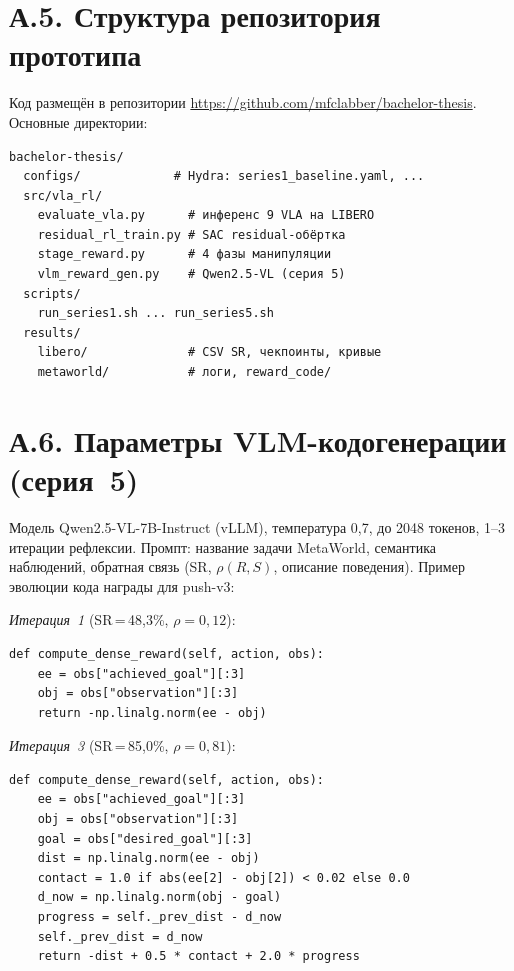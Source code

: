 \section*{А.5. Структура репозитория прототипа}

    Код размещён в репозитории \url{https://github.com/mfclabber/bachelor-thesis}. Основные директории:
{\footnotesize
\begin{verbatim}
bachelor-thesis/
  configs/             # Hydra: series1_baseline.yaml, ...
  src/vla_rl/
    evaluate_vla.py      # инференс 9 VLA на LIBERO
    residual_rl_train.py # SAC residual-обёртка
    stage_reward.py      # 4 фазы манипуляции
    vlm_reward_gen.py    # Qwen2.5-VL (серия 5)
  scripts/
    run_series1.sh ... run_series5.sh
  results/
    libero/              # CSV SR, чекпоинты, кривые
    metaworld/           # логи, reward_code/
\end{verbatim}
}

\section*{А.6. Параметры VLM-кодогенерации (серия~5)}

    Модель Qwen2.5-VL-7B-Instruct (vLLM), температура 0,7, до 2048 токенов, 1--3 итерации рефлексии. Промпт: название задачи MetaWorld, семантика наблюдений, обратная связь (SR, $\rho(R,S)$, описание поведения). Пример эволюции кода награды для push-v3:

    \textit{Итерация~1} (SR\,=\,48,3\%, $\rho = 0{,}12$):
{\footnotesize
\begin{verbatim}
def compute_dense_reward(self, action, obs):
    ee = obs["achieved_goal"][:3]
    obj = obs["observation"][:3]
    return -np.linalg.norm(ee - obj)
\end{verbatim}
}

    \textit{Итерация~3} (SR\,=\,85,0\%, $\rho = 0{,}81$):
{\footnotesize
\begin{verbatim}
def compute_dense_reward(self, action, obs):
    ee = obs["achieved_goal"][:3]
    obj = obs["observation"][:3]
    goal = obs["desired_goal"][:3]
    dist = np.linalg.norm(ee - obj)
    contact = 1.0 if abs(ee[2] - obj[2]) < 0.02 else 0.0
    d_now = np.linalg.norm(obj - goal)
    progress = self._prev_dist - d_now
    self._prev_dist = d_now
    return -dist + 0.5 * contact + 2.0 * progress
\end{verbatim}
}

